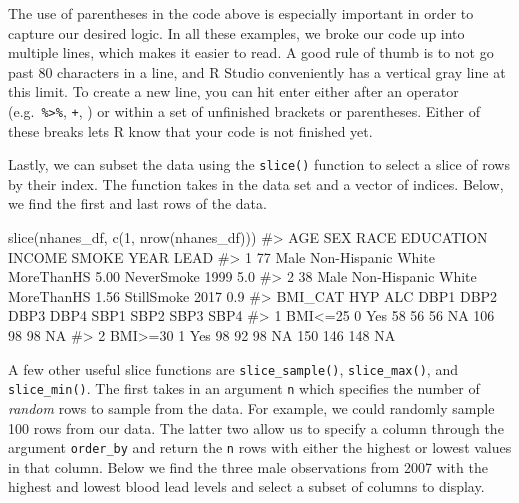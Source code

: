 \documentclass[
  letterpaper,
]{krantz}
\makeatletter
\newenvironment{Shaded}{\begin{snugshade}}{\end{snugshade}}
\newcommand{\CommentTok}[1]{\textcolor[rgb]{0.37,0.37,0.37}{#1}}
\newcommand{\DecValTok}[1]{\textcolor[rgb]{0.68,0.00,0.00}{#1}}
\newcommand{\FunctionTok}[1]{\textcolor[rgb]{0.28,0.35,0.67}{#1}}
\newcommand{\NormalTok}[1]{\textcolor[rgb]{0.00,0.23,0.31}{#1}}
\newenvironment{kframe}{%
\medskip{}
\setlength{\fboxsep}{.8em}
 \def\at@end@of@kframe{}%
 \ifinner\ifhmode%
  \def\at@end@of@kframe{\end{minipage}}%
  \begin{minipage}{\columnwidth}%
 \fi\fi%
 \def\FrameCommand##1{\hskip\@totalleftmargin \hskip-\fboxsep
 \colorbox{shadecolor}{##1}\hskip-\fboxsep
     \hskip-\linewidth \hskip-\@totalleftmargin \hskip\columnwidth}%
 \MakeFramed {\advance\hsize-\width
   \@totalleftmargin\z@ \linewidth\hsize
   \@setminipage}}%
 {\par\unskip\endMakeFramed%
 \at@end@of@kframe}
\renewenvironment{Shaded}{\begin{kframe}}{\end{kframe}}
\makeatother
\begin{document}
The use of parentheses in the code above is especially important in
order to capture our desired logic. In all these examples, we broke our
code up into multiple lines, which makes it easier to read. A good rule
of thumb is to not go past 80 characters in a line, and R Studio
conveniently has a vertical gray line at this limit. To create a new
line, you can hit enter either after an operator
(e.g.~\texttt{\%\textgreater{}\%}, \texttt{+}, \texttt{\textbar{}}) or
within a set of unfinished brackets or parentheses. Either of these
breaks lets R know that your code is not finished yet.

Lastly, we can subset the data using the \texttt{slice()} function to
select a slice of rows by their index. The function takes in the data
set and a vector of indices. Below, we find the first and last rows of
the data.

\begin{Shaded}
\begin{Highlighting}[]
\FunctionTok{slice}\NormalTok{(nhanes\_df, }\FunctionTok{c}\NormalTok{(}\DecValTok{1}\NormalTok{, }\FunctionTok{nrow}\NormalTok{(nhanes\_df)))}
\CommentTok{\#\textgreater{}   AGE  SEX               RACE  EDUCATION INCOME      SMOKE YEAR LEAD}
\CommentTok{\#\textgreater{} 1  77 Male Non{-}Hispanic White MoreThanHS   5.00 NeverSmoke 1999  5.0}
\CommentTok{\#\textgreater{} 2  38 Male Non{-}Hispanic White MoreThanHS   1.56 StillSmoke 2017  0.9}
\CommentTok{\#\textgreater{}   BMI\_CAT HYP ALC DBP1 DBP2 DBP3 DBP4 SBP1 SBP2 SBP3 SBP4}
\CommentTok{\#\textgreater{} 1 BMI\textless{}=25   0 Yes   58   56   56   NA  106   98   98   NA}
\CommentTok{\#\textgreater{} 2 BMI\textgreater{}=30   1 Yes   98   92   98   NA  150  146  148   NA}
\end{Highlighting}
\end{Shaded}

A few other useful slice functions are \texttt{slice\_sample()},
\texttt{slice\_max()}, and \texttt{slice\_min()}. The first takes in an
argument \texttt{n} which specifies the number of \emph{random} rows to
sample from the data. For example, we could randomly sample 100 rows
from our data. The latter two allow us to specify a column through the
argument \texttt{order\_by} and return the \texttt{n} rows with either
the highest or lowest values in that column. Below we find the three
male observations from 2007 with the highest and lowest blood lead
levels and select a subset of columns to display.
\end{document}
